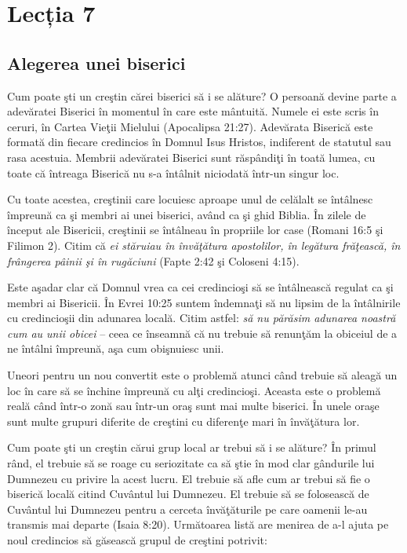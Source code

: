 \newpage

\section*{Lecția 7}

\subsection*{Alegerea unei biserici}

Cum poate şti un creştin cărei biserici să i se alăture? O persoană devine parte a adevăratei Biserici în momentul în care este mântuită. Numele ei este scris în ceruri, în Cartea Vieţii Mielului (Apocalipsa 21:27). Adevărata Biserică este formată din fiecare credincios în Domnul Isus Hristos, indiferent de statutul sau rasa acestuia. Membrii adevăratei Biserici sunt răspândiţi în toată lumea, cu toate că întreaga Biserică nu s-a întâlnit niciodată într-un singur loc.

Cu toate acestea, creştinii care locuiesc aproape unul de celălalt se întâlnesc împreună ca şi membri ai unei biserici, având ca şi ghid Biblia. În zilele de început ale Bisericii, creştinii se întâlneau în propriile lor case (Romani 16:5 şi Filimon 2). Citim că \textit{ei stăruiau în învăţătura apostolilor, în legătura frăţească, în frângerea pâinii şi în rugăciuni} (Fapte 2:42 şi Coloseni 4:15).

Este aşadar clar că Domnul vrea ca cei credincioşi să se întâlnească regulat ca şi membri ai Bisericii. În Evrei 10:25 suntem îndemnaţi să nu lipsim de la întâlnirile cu credincioşii din adunarea locală. Citim astfel: \textit{să nu părăsim adunarea noastră cum au unii obicei} – ceea ce înseamnă că nu trebuie să renunţăm la obiceiul de a ne întâlni împreună, aşa cum obişnuiesc unii.

Uneori pentru un nou convertit este o problemă atunci când trebuie să aleagă un loc în care să se închine împreună cu alţi credincioşi. Aceasta este o problemă reală când într-o zonă sau într-un oraş sunt mai multe biserici. În unele oraşe sunt multe grupuri diferite de creştini cu diferenţe mari în învăţătura lor.

Cum poate şti un creştin cărui grup local ar trebui să i se alăture? În primul rând, el trebuie să se roage cu seriozitate ca să ştie în mod clar gândurile lui Dumnezeu cu privire la acest lucru. El trebuie să afle cum ar trebui să fie o biserică locală citind Cuvântul lui Dumnezeu. El trebuie să se folosească de Cuvântul lui Dumnezeu pentru a cerceta învăţăturile pe care oamenii le-au transmis mai departe (Isaia 8:20). Următoarea listă are menirea de a-l ajuta pe noul credincios să găsească grupul de creştini potrivit:

